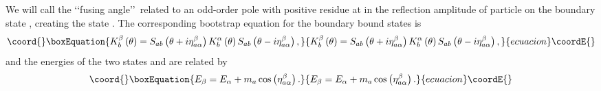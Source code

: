 \documentclass[a4paper,12pt]{report}
\begin{document}
We will call \coordHE{} the \lq\lq fusing angle\rq\rq \, related to an odd-order pole with positive
residue at \coordHE{} in the reflection amplitude \coordHE{} of particle \coordHE{} on
the boundary state \myHighlight{$\alpha$}\coordHE{}, creating the state \myHighlight{$\beta$}\coordHE{}. The corresponding bootstrap equation for the boundary
bound states is
\begin{equation}\coord{}\boxEquation{\label{boundst}
K_{b}^{\beta}\left(\theta\right)=S_{ab}\left(\theta+i\eta_{a\alpha}^{\beta}\right)K_{b}^{\alpha}\left(\theta\right)S_{ab}\left(\theta-i\eta_{a\alpha}^{\beta}\right),
}{K_{b}^{\beta}\left(\theta\right)=S_{ab}\left(\theta+i\eta_{a\alpha}^{\beta}\right)K_{b}^{\alpha}\left(\theta\right)S_{ab}\left(\theta-i\eta_{a\alpha}^{\beta}\right),
}{ecuacion}\coordE{}\end{equation}
and the energies of the two states \myHighlight{$|\alpha\rangle$}\coordHE{} and \myHighlight{$|\beta\rangle$}\coordHE{} are related by
\begin{equation}\coord{}\boxEquation{\label{energy}
E_{\beta}=E_{\alpha}+m_{a}\cos\left(\eta_{a\alpha}^{\beta}\right).
}{E_{\beta}=E_{\alpha}+m_{a}\cos\left(\eta_{a\alpha}^{\beta}\right).
}{ecuacion}\coordE{}\end{equation}

\vspace{4.5cm}
\end{document}
